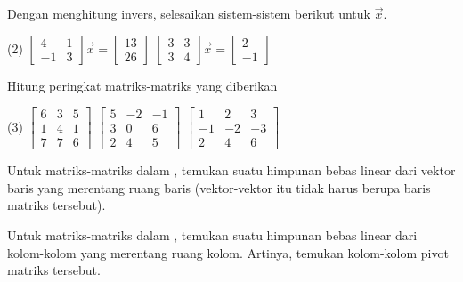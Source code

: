 \begin{exercise}
Dengan menghitung invers,
selesaikan sistem-sistem berikut untuk $\vec{x}$.
\begin{tasks}(2)
\task
$\begin{bmatrix}
4 & 1 \\
-1 & 3
\end{bmatrix} \vec{x} =
\begin{bmatrix} 13 \\ 26 \end{bmatrix}$
\task
$\begin{bmatrix}
3 & 3 \\
3 & 4
\end{bmatrix} \vec{x} =
\begin{bmatrix} 2 \\ -1 \end{bmatrix}$
\end{tasks}
\end{exercise}

\begin{exercise} \label{exercise:rankmatrix}
Hitung peringkat matriks-matriks yang diberikan
\begin{tasks}(3)
\task
$\begin{bmatrix}
6 & 3 & 5 \\
1 & 4 & 1 \\
7 & 7 & 6
\end{bmatrix}$
\task
$\begin{bmatrix}
5 & -2 & -1 \\
3 & 0 & 6 \\
2 & 4 & 5
\end{bmatrix}$
\task
$\begin{bmatrix}
1 & 2 & 3 \\
-1 & -2 & -3 \\
2 & 4 & 6
\end{bmatrix}$
\end{tasks}
\end{exercise}

\begin{exercise}
Untuk matriks-matriks dalam , temukan
suatu himpunan bebas linear dari vektor baris yang merentang ruang baris
(vektor-vektor itu tidak harus berupa baris matriks tersebut).
\end{exercise}

\begin{exercise}
Untuk matriks-matriks dalam , temukan
suatu himpunan bebas linear dari kolom-kolom yang merentang ruang kolom.
Artinya, temukan kolom-kolom pivot matriks tersebut.
\end{exercise}

